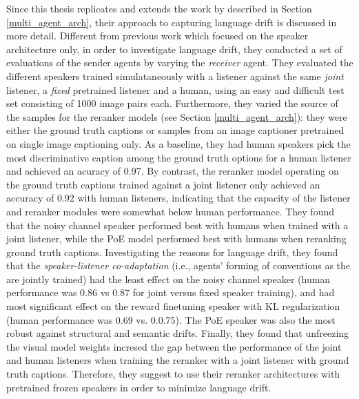 Since this thesis replicates and extends the work by \cite{lazaridou2020multi} described in Section \ref{multi_agent_arch}, their approach to capturing language drift is discussed in more detail.
Different from previous work which focused on the speaker architecture only, in order to investigate language drift, they conducted a set of evaluations of the sender agents by varying the \emph{receiver} agent. They evaluated the different speakers trained simulataneously with a listener against the same \textit{joint} listener, a \textit{fixed} pretrained listener and a human, using an easy and difficult test set consisting of 1000 image pairs each. Furthermore, they varied the source of the samples for the reranker models (see Section \ref{multi_agent_arch}): they were either the ground truth captions or samples from an image captioner pretrained on single image captioning only. As a baseline, they had human speakers pick the most discriminative caption among the ground truth options for a human listener and achieved an acuracy of 0.97. By contrast, the reranker model operating on the ground truth captions trained against a joint listener only achieved an accuracy of 0.92 with human listeners, indicating that the capacity of the listener and reranker modules were somewhat below human performance. They found that the noisy channel speaker performed best with humans when trained with a joint listener, while the PoE model performed best with humans when reranking ground truth captions. Investigating the reasons for language drift, they found that the \emph{speaker-listener co-adaptation} (i.e., agents' forming of conventions as the are jointly trained) had the least effect on the noisy channel speaker (human performance was 0.86 vs 0.87 for joint versus fixed speaker training), and had most significant effect on the reward finetuning speaker with KL regularization (human performance was 0.69 vs. 0.0.75). The PoE speaker was also the most robust against structural and semantic drifts. Finally, they found that unfreezing the visual model weights incresed the gap between the performance of the joint and human listeners when training the reranker with a joint listener with ground truth captions. Therefore, they suggest to use their reranker architectures with pretrained frozen speakers in order to minimize language drift.

